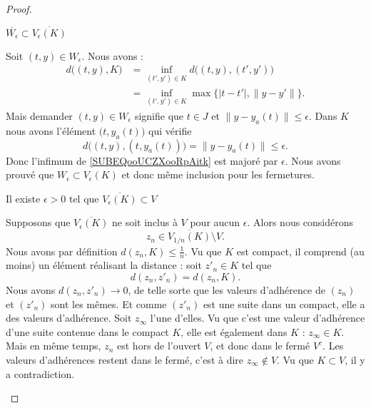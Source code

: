 \begin{proof}
    \begin{subproof}
    \item[\( \overline{ W_{\epsilon} }\subset \overline{  V_{\epsilon}(K) }\)]

        Soit \( (t,y)\in W_{\epsilon}\). Nous avons :
        \begin{subequations}
            \begin{align}
                d\big( (t,y),K \big)&=\inf_{(t',y')\in K}d\big( (t,y),(t',y') \big)\\
                &=\inf_{(t',y')\in K}\max\{ | t-t' |,\| y-y' \| \}.     \label{SUBEQooUCZXooRpAitk}
            \end{align}
        \end{subequations}
        Mais demander \( (t,y)\in W_{\epsilon}\) signifie que \( t\in J\) et \( \| y-y_a(t) \|\leq \epsilon\). Dans \( K \) nous avons l'élément \( \big( t,y_a(t) \big)\) qui vérifie
        \begin{equation}
            d\big( (t,y),(t,y_a(t)) \big)=\| y-y_a(t) \|\leq \epsilon.
        \end{equation}
        Donc l'infimum de \eqref{SUBEQooUCZXooRpAitk} est majoré par \( \epsilon\). Nous avons prouvé que \( W_{\epsilon}\subset V_{\epsilon}(K)\) et donc même inclusion pour les fermetures.

    \item[Il existe \( \epsilon>0\) tel que \( \overline{ V_{\epsilon}(K) }\subset V\)]

        Supposons que \( \overline{ V_{\epsilon}(K) }\) ne soit inclus à \( V\) pour aucun \( \epsilon\). Alors nous considérons 
        \begin{equation}
            z_n\in \overline{ V_{1/n}(K) }\setminus V.
        \end{equation}
        Nous avons par définition \( d(z_n,K)\leq \frac{1}{ n }\). Vu que \( K\) est compact, il comprend (au moins) un élément réalisant la distance : soit \( z'_n\in K\) tel que
        \begin{equation}
            d(z_n,z'_n)=d(z_n,K).
        \end{equation}
        Nous avons \( d(z_n,z'_n)\to 0\), de telle sorte que les valeurs d'adhérence de \( (z_n)\) et \( (z'_n)\) sont les mêmes. Et comme \( (z'_n)\) est une suite dans un compact, elle a des valeurs d'adhérence. Soit \( z_{\infty}\) l'une d'elles. Vu que c'est une valeur d'adhérence d'une suite contenue dans le compact \( K\), elle est également dans \( K\) : \( z_{\infty}\in K\). Mais en même temps, \( z_n\) est hors de l'ouvert \( V\), et donc dans le fermé \( V^c\). Les valeurs d'adhérences restent dans le fermé, c'est à dire \( z_{\infty}\notin V\). Vu que \( K\subset V\), il y a contradiction.


\end{subproof}
\end{proof}
